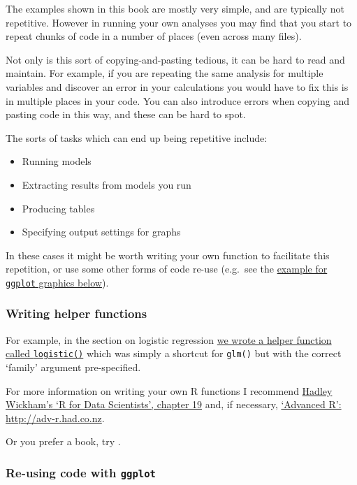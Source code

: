 \documentclass[]{article}
\providecommand{\tightlist}{%
  \setlength{\itemsep}{0pt}\setlength{\parskip}{0pt}}
\begin{document}
The examples shown in this book are mostly very simple, and are typically not
repetitive. However in running your own analyses you may find that you start to
repeat chunks of code in a number of places (even across many files).

Not only is this sort of copying-and-pasting tedious, it can be hard to read and
maintain. For example, if you are repeating the same analysis for multiple
variables and discover an error in your calculations you would have to fix this
is in multiple places in your code. You can also introduce errors when copying
and pasting code in this way, and these can be hard to spot.

The sorts of tasks which can end up being repetitive include:

\begin{itemize}
\tightlist
\item
  Running models
\item
  Extracting results from models you run
\item
  Producing tables
\item
  Specifying output settings for graphs
\end{itemize}

In these cases it might be worth writing your own function to facilitate this
repetition, or use some other forms of code re-use (e.g.~see the
\protect\hyperlink{ggplot-reuse}{example for \texttt{ggplot} graphics below}).

\hypertarget{helper-functions}{%
\subsubsection*{Writing helper functions}\label{helper-functions}}

For example, in the section on logistic regression
\protect\hyperlink{helper-function-logistic}{we wrote a helper function called \texttt{logistic()}}
which was simply a shortcut for \texttt{glm()} but with the correct `family' argument
pre-specified.

For more information on writing your own R functions I recommend
\href{http://r4ds.had.co.nz/functions.html}{Hadley Wickham's `R for Data Scientists', chapter 19}
and, if necessary,
\href{http://adv-r.had.co.nz}{`Advanced R': http://adv-r.had.co.nz}.

Or you prefer a book, try \citet{grolemund2014hands}.

\hypertarget{ggplot-reuse}{%
\subsubsection*{\texorpdfstring{Re-using code with \texttt{ggplot}}{Re-using code with ggplot}}\label{ggplot-reuse}}
\end{document}
